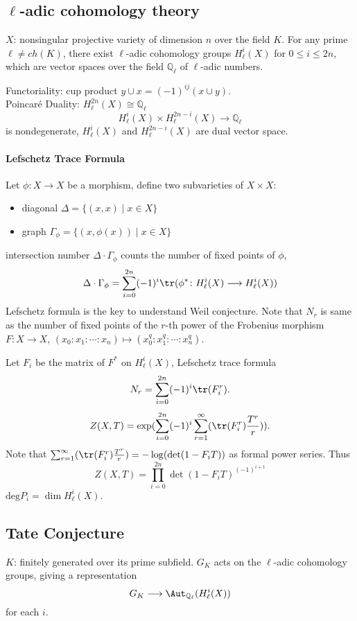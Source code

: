 \subsection{$\ell$-adic cohomology theory}
$X$: nonsingular projective variety of dimension $n$ over the field $K$. For any prime $\ell\neq ch(K)$, there exist $\ell$-adic cohomology groups $H^i_{\ell}(X)$ for $0\leq i \leq 2n$, which are vector spaces over the field $\mathbb{Q}_{\ell}$ of $\ell$-adic numbers.

Functoriality: cup product $y\cup x =(-1)^{ij}(x\cup y)$.\\
Poincar\'{e} Duality: $H^{2n}_{\ell}(X)\cong \mathbb{Q}_{\ell}$
\[H^i_{\ell}(X)\times H^{2n-i}_{\ell}(X) \longrightarrow \mathbb{Q}_{\ell}\]
is nondegenerate, $H^i_{\ell}(X)$ and $H^{2n-i}_{\ell}(X)$ are dual vector space.
\paragraph{Lefschetz Trace Formula} Let $\phi \colon X \longrightarrow X$ be a morphism, define two subvarieties of $X\times X$:
\begin{itemize}
	\item diagonal $\Delta =\{(x,x)\mid x\in X\}$
	\item graph $\Gamma_\phi =\{(x,\phi(x))\mid x\in X\}$
\end{itemize}
intersection number $\Delta\cdot \Gamma_\phi$ counts the number of fixed points of $\phi$,
\[\Delta\cdot \Gamma_\phi=\sum_{i=0}^{2n}(-1)^i\tr(\phi^*\colon H^i_{\ell}(X)\longrightarrow H^i_{\ell}(X)) \]
Lefschetz formula is the key to understand Weil conjecture. Note that $N_r$ is same as the number of fixed points of the $r$-th power of the Frobenius morphism $F\colon X\longrightarrow X$, $(x_0:x_1:\cdots:x_n)\mapsto (x_0^q:x_1^q:\cdots:x_n^q)$.

Let $F_i$ be the matrix of $F^*$ on $H^i_\ell(X)$, Lefschetz trace formula
\[N_r=\sum_{i=0}^{2n}(-1)^i\tr(F_i^r).\]
\[Z(X,T)=\exp(\sum_{i=0}^{2n}(-1)^i\sum_{r=1}^{\infty}(\tr(F_i^r)\frac{T^r}{r})).\]
Note that $\sum_{r=1}^{\infty}(\tr(F_i^r)\frac{T^r}{r})=-\log(\det(1-F_iT))$ as formal power series. Thus
\[Z(X,T)=\prod_{i=0}^{2n}\det(1-F_iT)^{(-1)^{i+1}}\]
$\mathrm{deg} P_i=\dim H^i_\ell(X)$.

\subsection{Tate Conjecture}
$K$: finitely generated over its prime subfield. $G_K$ acts on the $\ell$-adic cohomology groups, giving a representation
\[G_K\longrightarrow \Aut_{\mathbb{Q}_\ell}(H^i_\ell(X))\]
for each $i$.

